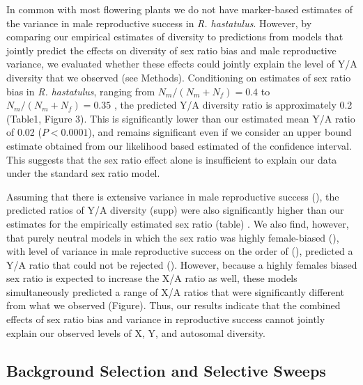 \documentclass[9pt,twocolumn,twoside]{gsajnl}
\begin{document}
In common with most flowering plants we do not have marker-based estimates of the variance in male reproductive success in \textit{R. hastatulus}. However, by comparing our empirical estimates of diversity to predictions from models that jointly predict the effects on diversity of sex ratio bias and male reproductive variance, we evaluated whether these effects could jointly explain the level of Y/A diversity that we observed (see Methods). Conditioning on estimates of sex ratio bias in \textit{R. hastatulus}, ranging from $N_{m}/(N_{m}+N_{f})=0.4$ to $N_{m}/(N_{m}+N_{f})=0.35$ \citep{pickup2013influence}, the predicted Y/A diversity ratio  is approximately 0.2 (Table1, Figure 3). This is significantly lower than our estimated mean Y/A ratio of 0.02 ($\textit{P}<0.0001$), and remains significant even if we consider an upper bound estimate obtained from our likelihood based estimated of the confidence interval. This suggests that the sex ratio effect alone is insufficient to explain our data under the standard sex ratio model.

Assuming that there is extensive variance in male reproductive success (\X), the predicted ratios of Y/A diversity (\X supp) were also significantly higher than our estimates for the empirically estimated sex ratio (\X table) . We also find, however, that purely neutral models in which the sex ratio was highly female-biased (\X), with level of variance in male reproductive success on the order of (\X), predicted a Y/A ratio that could not be rejected (\X). However, because a highly females biased sex ratio is expected to increase the X/A ratio as well, these models simultaneously predicted a range of X/A ratios that were significantly different from what we observed (\X Figure). Thus, our results indicate that the combined effects of sex ratio bias and variance in reproductive success cannot jointly explain our observed levels of X, Y, and autosomal diversity.

\subsection*{Background Selection and Selective Sweeps}


\end{document}
